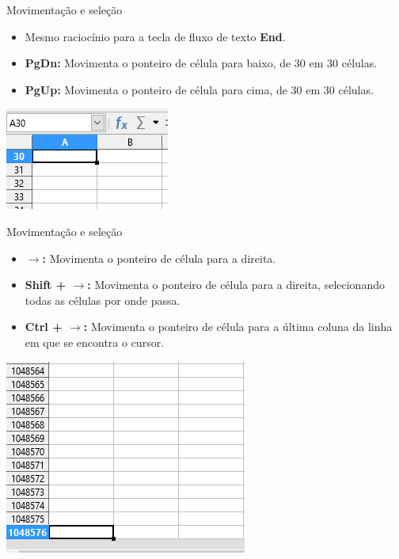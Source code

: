 \begin{frame}{Movimentação e seleção}
	\begin{block}{}
		\begin{itemize}
			\item Mesmo raciocínio para a tecla de fluxo de texto \textbf{End}.
			\item \textbf{PgDn:} Movimenta o ponteiro de célula para baixo, de 30 em 30 células.
			\item \textbf{PgUp:} Movimenta o ponteiro de célula para cima, de 30 em 30 células.
		\end{itemize}
	\end{block}
	
	\centering
	\includegraphics[width=0.7\linewidth]{Figuras/Ch06/fig14}
\end{frame}


\begin{frame}{Movimentação e seleção}
	\begin{block}{}
		\begin{itemize}
			\item \textbf{$ \bm{\to} $:} Movimenta o ponteiro de célula para a direita.
			\item \textbf{Shift + $\bm{\to}$:} Movimenta o ponteiro de célula para a direita, selecionando todas as células por onde passa.
			\item \textbf{Ctrl + $\bm{\to}$:} Movimenta o ponteiro de célula para a última coluna da linha em que se encontra o cursor.
		\end{itemize}
	\end{block}
	
	\centering
	\includegraphics[width=0.5\linewidth]{Figuras/Ch06/fig15}
\end{frame}


